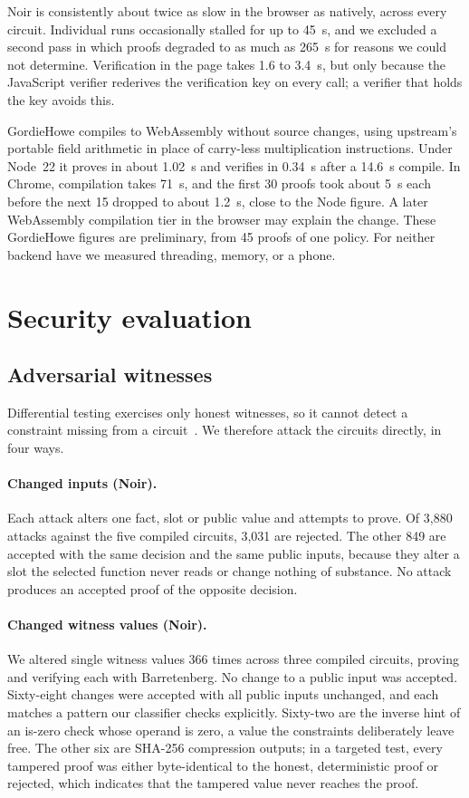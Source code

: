 \documentclass[11pt]{article}
\begin{document}
Noir is consistently about twice as slow in the browser as natively, across every circuit. Individual runs occasionally stalled for up to 45~s, and we excluded a second pass in which proofs degraded to as much as 265~s for reasons we could not determine. Verification in the page takes 1.6 to 3.4~s, but only because the JavaScript verifier rederives the verification key on every call; a verifier that holds the key avoids this.

GordieHowe compiles to WebAssembly without source changes, using upstream's portable field arithmetic in place of carry-less multiplication instructions. Under Node~22 it proves in about 1.02~s and verifies in 0.34~s after a 14.6~s compile. In Chrome, compilation takes 71~s, and the first 30 proofs took about 5~s each before the next 15 dropped to about 1.2~s, close to the Node figure. A later WebAssembly compilation tier in the browser may explain the change. These GordieHowe figures are preliminary, from 45 proofs of one policy. For neither backend have we measured threading, memory, or a phone.

\section{Security evaluation}

\subsection{Adversarial witnesses}
\label{sec:attacks}

Differential testing exercises only honest witnesses, so it cannot detect a constraint missing from a circuit~\citep{watzinger2026lie}. We therefore attack the circuits directly, in four ways.

\paragraph{Changed inputs (Noir).} Each attack alters one fact, slot or public value and attempts to prove. Of 3,880 attacks against the five compiled circuits, 3,031 are rejected. The other 849 are accepted with the same decision and the same public inputs, because they alter a slot the selected function never reads or change nothing of substance. No attack produces an accepted proof of the opposite decision.

\paragraph{Changed witness values (Noir).} We altered single witness values 366 times across three compiled circuits, proving and verifying each with Barretenberg. No change to a public input was accepted. Sixty-eight changes were accepted with all public inputs unchanged, and each matches a pattern our classifier checks explicitly. Sixty-two are the inverse hint of an is-zero check whose operand is zero, a value the constraints deliberately leave free. The other six are SHA-256 compression outputs; in a targeted test, every tampered proof was either byte-identical to the honest, deterministic proof or rejected, which indicates that the tampered value never reaches the proof.
\end{document}
